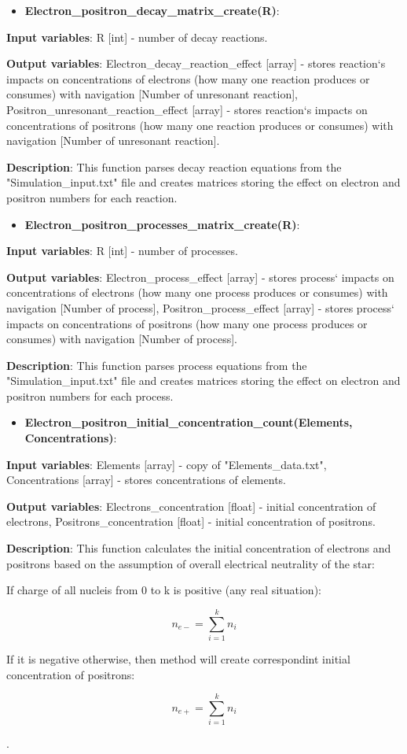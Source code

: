 \documentclass[a4paper,12pt]{article}
\newcommand{\namefunction}[4]{
  \begin{itemize}
    \item \textbf{#1}:
  \end{itemize}
  
  \textbf{Input variables}: #2.
  
  \textbf{Output variables}: #4.
  
  \textbf{Description}: #3.
}
\begin{document}
\namefunction{Electron\_positron\_decay\_matrix\_create(R)}{R [int] - number of decay reactions}{This function parses decay reaction equations from the "Simulation\_input.txt" file and creates matrices storing the effect on electron and positron numbers for each reaction}{Electron\_decay\_reaction\_effect [array] - stores reaction`s  impacts on concentrations of electrons (how many one reaction produces or consumes) with navigation [Number of unresonant reaction], Positron\_unresonant\_reaction\_effect [array] - stores reaction`s impacts on concentrations of positrons (how many one reaction produces or consumes) with navigation [Number of unresonant reaction]}

\vspace{1em}

\namefunction{Electron\_positron\_processes\_matrix\_create(R)}{R [int] - number of processes}{This function parses process equations from the "Simulation\_input.txt" file and creates matrices storing the effect on electron and positron numbers for each process}{Electron\_process\_effect [array] - stores process` impacts on concentrations of electrons (how many one process produces or consumes) with navigation [Number of process], Positron\_process\_effect [array] - stores process` impacts on concentrations of positrons (how many one process produces or consumes) with navigation [Number of process]}

\vspace{1em}

\namefunction{Electron\_positron\_initial\_concentration\_count(Elements, Concentrations)}{Elements [array] - copy of "Elements\_data.txt", Concentrations [array] - stores concentrations of elements}{This function calculates the initial concentration of electrons and positrons based on the assumption of overall electrical neutrality of the star:

If charge of all nucleis from 0 to k is positive (any real situation):

\[n_{e-} = \sum_{i = 1}^{k} n_{i}\]

If it is negative otherwise, then method will create correspondint initial concentration of positrons:

\[n_{e+} = \sum_{i = 1}^{k} n_{i}\]

}{Electrons\_concentration [float] - initial concentration of electrons, Positrons\_concentration [float] - initial concentration of positrons}

\vspace{1em}
\end{document}
